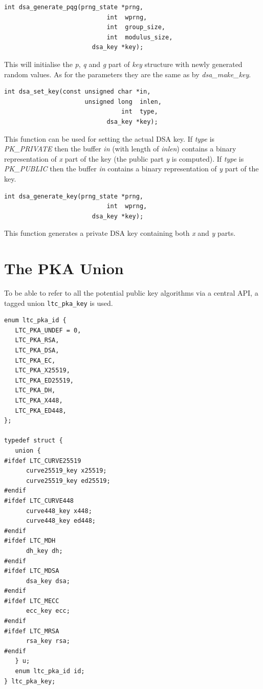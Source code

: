 \documentclass[synpaper]{book}
\begin{document}
\begin{verbatim}
int dsa_generate_pqg(prng_state *prng,
                            int  wprng,
                            int  group_size,
                            int  modulus_size,
                        dsa_key *key);
\end{verbatim}

This will initialise the \textit{p}, \textit{q} and \textit{g} part of \textit{key} structure with newly generated random values.
As for the parameters they are the same as by \textit{dsa\_make\_key}.

\begin{verbatim}
int dsa_set_key(const unsigned char *in,
                      unsigned long  inlen,
                                int  type,
                            dsa_key *key);
\end{verbatim}

This function can be used for setting the actual DSA key. If \textit{type} is \textit{PK\_PRIVATE} then the buffer \textit{in}
(with length of \textit{inlen}) contains a binary representation of \textit{x} part of the key (the public part \textit{y} is computed).
If \textit{type} is \textit{PK\_PUBLIC} then the buffer \textit{in} contains a binary representation of \textit{y} part of the key.

\begin{verbatim}
int dsa_generate_key(prng_state *prng,
                            int  wprng,
                        dsa_key *key);
\end{verbatim}

This function generates a private DSA key containing both \textit{x} and \textit{y} parts.

\chapter{The PKA Union}

To be able to refer to all the potential public key algorithms via a central API,
a tagged union \texttt{ltc\_pka\_key} is used.

\begin{small}
\begin{verbatim}
enum ltc_pka_id {
   LTC_PKA_UNDEF = 0,
   LTC_PKA_RSA,
   LTC_PKA_DSA,
   LTC_PKA_EC,
   LTC_PKA_X25519,
   LTC_PKA_ED25519,
   LTC_PKA_DH,
   LTC_PKA_X448,
   LTC_PKA_ED448,
};

typedef struct {
   union {
#ifdef LTC_CURVE25519
      curve25519_key x25519;
      curve25519_key ed25519;
#endif
#ifdef LTC_CURVE448
      curve448_key x448;
      curve448_key ed448;
#endif
#ifdef LTC_MDH
      dh_key dh;
#endif
#ifdef LTC_MDSA
      dsa_key dsa;
#endif
#ifdef LTC_MECC
      ecc_key ecc;
#endif
#ifdef LTC_MRSA
      rsa_key rsa;
#endif
   } u;
   enum ltc_pka_id id;
} ltc_pka_key;
\end{verbatim}
\end{small}
\end{document}
